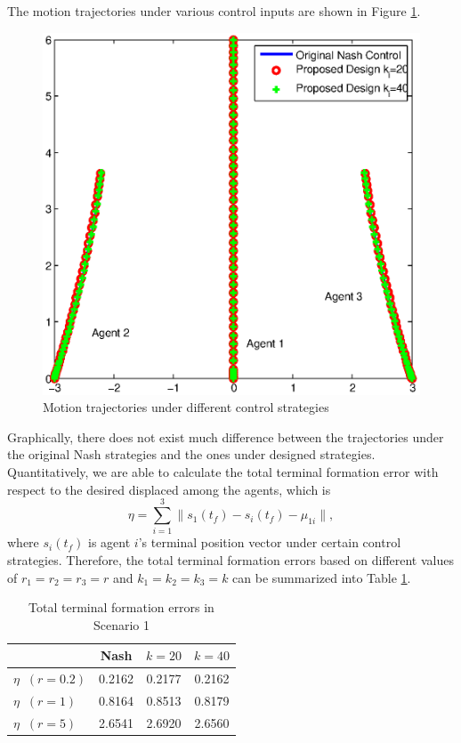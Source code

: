 \documentclass[12pt,draftcls,onecolumn]{IEEEtran}  %
\begin{document}
The motion trajectories under various control inputs are shown in Figure \ref{TrajectoryUndirected}.
\begin{figure}[h]
      \centering
      \includegraphics[scale=0.5]{TrajectoryUndirected.eps}
      \caption{Motion trajectories under different control strategies}\label{TrajectoryUndirected}
\end{figure}
Graphically, there does not exist much difference between the trajectories under the original Nash strategies and the ones under designed strategies. Quantitatively, we are able to calculate the total terminal formation error with respect to the desired displaced among the agents, which is
\begin{equation}
\eta=\sum^3_{i=1}\|s_1(t_f)-s_i(t_f)-{\mu_{1i}}\|,
\end{equation}
where $s_i(t_f)$ is agent $i$'s terminal position vector under certain control strategies. Therefore, the total terminal formation errors based on different values of $r_1=r_2=r_3=r$ and $k_1=k_2=k_3=k$ can be summarized into Table \ref{Comparison}.
\begin{table}[h]\normalsize
\centering
\begin{tabular}{|l|c|c|c|}
  \hline
         & Nash & $k=20$ & $k=40$ \\
         \hline
         $\eta\;\;(r=0.2)$ & 0.2162 & 0.2177 & 0.2162 \\
         \hline
  $\eta\;\;(r=1)$ &  0.8164 &  0.8513 & 0.8179 \\
  \hline
  $\eta\;\;(r=5)$ &  2.6541 & 2.6920 & 2.6560 \\
  \hline
\end{tabular}
\caption{Total terminal formation errors in Scenario 1}\label{Comparison}
\end{table}
\end{document}

